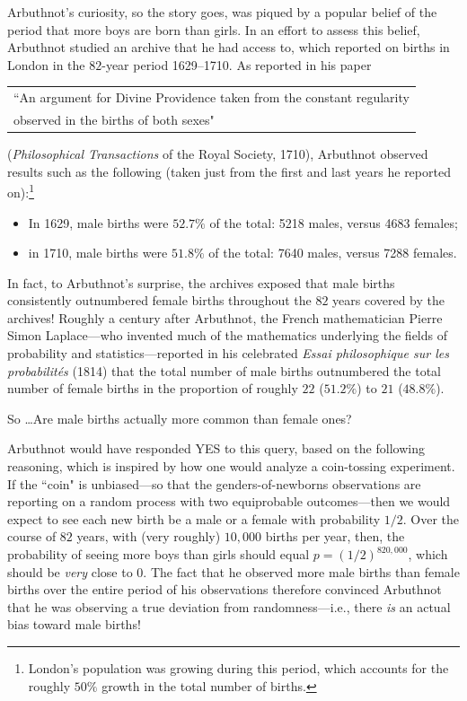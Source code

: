 Arbuthnot's curiosity, so the story goes, was piqued by a popular belief of the period that more boys are born than girls.  In an effort to assess this belief, Arbuthnot studied an archive that he had access to, which reported on births in London in the $82$-year period 1629--1710.  As reported in his paper

\begin{tabular}{l}
``An argument for Divine Providence taken from the constant regularity \\
\hspace*{.05in}observed in the births of both sexes"
\end{tabular}

\noindent
({\it Philosophical Transactions} of the Royal Society, 1710), Arbuthnot observed results such as the following (taken just from the first and last years he reported on):\footnote{London's population was growing during this period, which accounts for the roughly $50\%$ growth in the total number of births.}
\begin{itemize}
\item
In 1629, male births were $52.7\%$ of the total: 5218 males, versus 4683 females;
\item
in 1710, male births were $51.8\%$ of the total: 7640 males, versus 7288 females.
\end{itemize}
In fact, to Arbuthnot's surprise, the archives exposed that male births consistently outnumbered female births throughout the $82$ years covered by the archives!  Roughly a century after Arbuthnot, the French mathematician Pierre Simon Laplace---who invented much of the mathematics underlying the fields of probability and statistics---reported in his celebrated {\it Essai philosophique sur les probabilit\'{e}s} (1814)
that the total number of male births outnumbered the total number of female births in the proportion of roughly $22$ ($51.2\%$) to $21$ ($48.8\%$).

\medskip

\noindent
So \ldots Are male births actually more common than female ones?

\medskip

\noindent
Arbuthnot would have responded YES to this query, based on the following reasoning, which is inspired by how one would analyze a coin-tossing experiment.  If the ``coin" is unbiased---so that the genders-of-newborns observations are reporting on a random process with two equiprobable outcomes---then we would expect to see each new birth be a male or a female with probability $1/2$.  Over the course of $82$ years, with (very roughly) $10,000$ births per year, then, the probability of seeing more boys than girls should equal $p=(1/2)^{820,000}$, which should be {\em very} close to $0$.  The fact that he observed more male births than female births over the entire period of his observations therefore convinced Arbuthnot that he was observing a true deviation from randomness---i.e., there {\em is} an actual bias toward male births!


